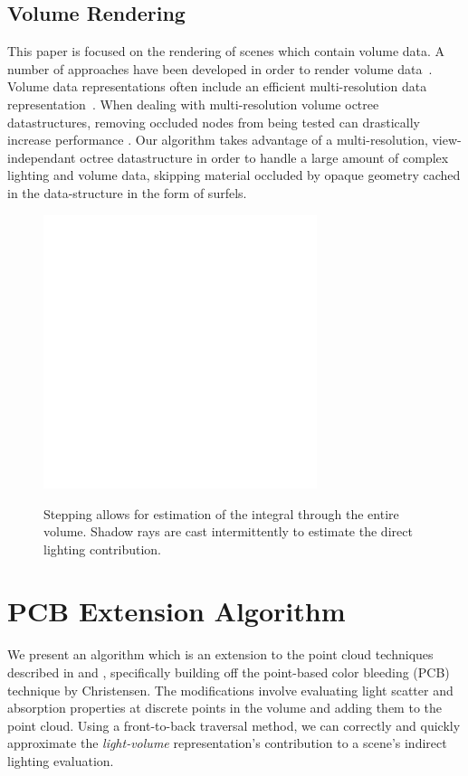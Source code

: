 \documentclass[12pt]{ucthesis}
\newcommand{\captionfonts}{\small\bf\ssp}
\begin{document}
\section{Volume Rendering}
This paper is focused on the rendering of scenes which contain volume data.  A number of approaches have been developed in order to render volume data~\cite{levoy88}\cite{Kajiya84}.  Volume data representations often include an efficient multi-resolution data representation~\cite{Westermann94}\cite{Levoy90}.  When dealing with multi-resolution volume octree datastructures, removing occluded nodes from being tested can drastically increase performance \cite{guthe}.  Our algorithm takes advantage of a multi-resolution, view-independant octree datastructure in order to handle a large amount of complex lighting and volume data, skipping material occluded by opaque geometry cached in the data-structure in the form of surfels.

\begin{figure}[h!]
    \centering
    \includegraphics[width=80mm]{img/diag/vol_step.pdf}
    \captionfonts
    \caption{Stepping allows for estimation of the integral through the entire volume.  Shadow rays are cast intermittently to estimate the direct lighting contribution. }
    \label{fig:vol_step}
\end{figure}

\chapter{PCB Extension Algorithm}
\label{algorithm_sec}
We present an algorithm which is an extension to the point cloud techniques described in \cite{tabellion} and \cite{christensen:2008}, specifically building off the point-based color bleeding (PCB) technique by Christensen.  The modifications involve evaluating light scatter and absorption properties at discrete points in the volume and adding them to the point cloud.  Using a front-to-back traversal method, we can correctly and quickly approximate the \textit{light-volume} representation's contribution to a scene's indirect lighting evaluation.
\end{document}
